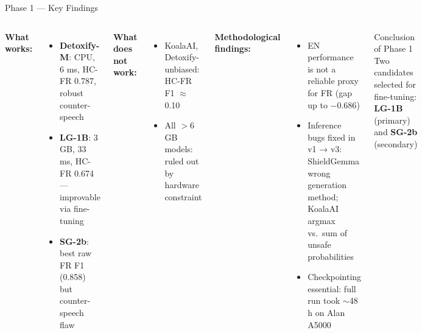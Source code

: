 \documentclass[aspectratio=169, 12pt]{beamer}
\newcommand{\good}[1]{\textcolor{okgreen}{\textbf{#1}}}
\newcommand{\bad}[1]{\textcolor{warnred}{\textbf{#1}}}
\begin{document}
\begin{frame}[shrink=25]{Phase 1 — Key Findings}
  \begin{columns}[T]
      \textbf{What works:}
      \begin{itemize}
        \item[\good{$\checkmark$}] \textbf{Detoxify-M}: CPU, 6 ms, HC-FR 0.787, robust counter-speech
        \item[\good{$\checkmark$}] \textbf{LG-1B}: 3 GB, 33 ms, HC-FR 0.674 — improvable via fine-tuning
        \item[\good{$\checkmark$}] \textbf{SG-2b}: best raw FR F1 (0.858) but counter-speech flaw
      \end{itemize}
      \vspace{4pt}
      \textbf{What does not work:}
      \begin{itemize}
        \item[\bad{$\times$}] KoalaAI, Detoxify-unbiased: HC-FR F1 $\approx$ 0.10
        \item[\bad{$\times$}] All $>$6 GB models: ruled out by hardware constraint
      \end{itemize}

      \textbf{Methodological findings:}
      \begin{itemize}
        \item EN performance is not a reliable proxy for FR (gap up to $-0.686$)
        \item Inference bugs fixed in v1 → v3: ShieldGemma wrong generation method; KoalaAI argmax vs.\ sum of unsafe probabilities
        \item Checkpointing essential: full run took $\sim$48 h on Alan A5000
      \end{itemize}
      \vspace{4pt}
      \begin{block}{Conclusion of Phase 1}
        Two candidates selected for fine-tuning:\\
        \textbf{LG-1B} (primary) and \textbf{SG-2b} (secondary)
      \end{block}
  \end{columns}
\end{frame}
\end{document}
